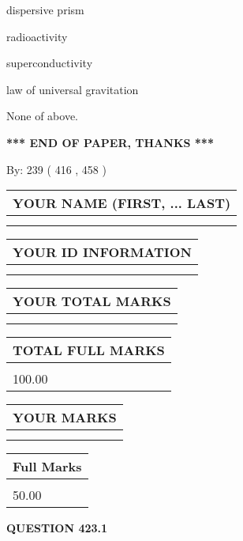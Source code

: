\documentclass[12pt]{article}
\begin{document}
 
dispersive prism
 
 
radioactivity
 
 
superconductivity
 
 
law of universal gravitation
 
 
 None of above.
 
 
   
   
\vspace{1.0in} 
{\textbf{\large{ *** END OF PAPER, THANKS *** }}} 
   
   
\hspace{1.0in} By: 
 239 ( 416 ,  458 )
   
   
   
   
\newpage 
\setcounter{page}{ 
   423001 } 
   
   
   
   
\noindent\begin{tabular}{|l|}
\hline
YOUR NAME (FIRST, ... LAST)  \\
\hline
 \\ 
 \\ 
\hline
\end{tabular}
\hspace{0.05in} \begin{tabular}{|l|}
\hline
 YOUR   ID   INFORMATION  \\
\hline
 \\ 
 \\ 
\hline
\end{tabular}
   
   
\vspace{0.2in}\noindent\begin{tabular}{|l|}
\hline
YOUR TOTAL MARKS  \\
\hline
 \\ 
 \\ 
\hline
\end{tabular}
\hspace{0.05in} \begin{tabular}{|l|}
\hline
TOTAL FULL MARKS  \\
\hline
 \\ 
100.00 \\
\hline
\end{tabular}
  
\vspace{0.2in}
  
\noindent\begin{tabular}{|l|}
\hline
 YOUR MARKS  \\
\hline
 \\ 
 \\ 
\hline
\end{tabular}
\hspace{0.05in} \begin{tabular}{|l|}
\hline
 Full Marks  \\
\hline
 \\ 
50.00 \\
\hline
\end{tabular}
{\textbf{\Large{QUESTION
423.1 
}}}
  
\end{document}
